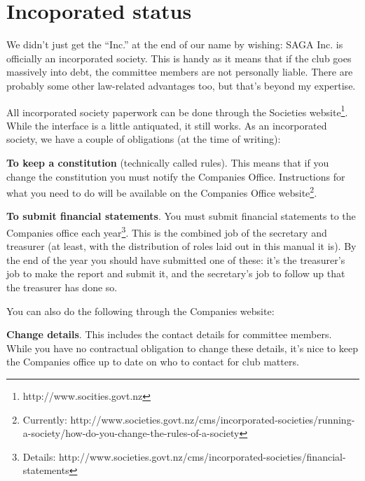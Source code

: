 \section{Incoporated status}
\label{sec:incorporation}

We didn't just get the ``Inc.'' at the end of our name by wishing: SAGA Inc. is officially an incorporated society. This is handy as it means that if the club goes massively into debt, the committee members are not personally liable. There are probably some other law-related advantages too, but that's beyond my expertise.

All incorporated society paperwork can be done through the Societies website\footnote{http://www.socities.govt.nz}. While the interface is a little antiquated, it still works. As an incorporated society, we have a couple of obligations (at the time of writing):

\textbf{To keep a constitution} (technically called rules). This means that if you change the constitution you must notify the Companies Office. Instructions for what you need to do will be available on the Companies Office website\footnote{Currently: http://www.societies.govt.nz/cms/incorporated-societies/running-a-society/how-do-you-change-the-rules-of-a-society}.

\textbf{To submit financial statements}. You must submit financial statements to the Companies office each year\footnote{Details: http://www.societies.govt.nz/cms/incorporated-societies/financial-statements}. This is the combined job of the secretary and treasurer (at least, with the distribution of roles laid out in this manual it is). By the end of the year you should have submitted one of these: it's the treasurer's job to make the report and submit it, and the secretary's job to follow up that the treasurer has done so.

You can also do the following through the Companies website:

\textbf{Change details}. This includes the contact details for committee members. While you have no contractual obligation to change these details, it's nice to keep the Companies office up to date on who to contact for club matters.